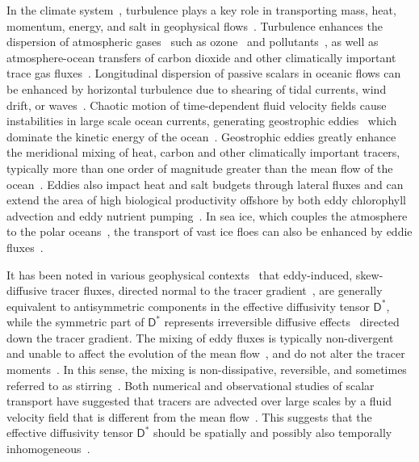 \documentclass[leqno,onefignum,onetabnum]{siamltex1213}
\newcommand{\Dm}{\mathsf{D}}
\begin{document}
In the climate
system~\cite{Csanady:1973:9789027702609,Griffies:2003:10.1007},
turbulence plays a key role in transporting mass, heat, momentum,
energy, and salt in geophysical
flows~\cite{Moffatt:RPP:621}. Turbulence enhances the dispersion of
atmospheric gases~\cite{Espinosa:MET1292} such as
ozone~\cite{Holton:JGRC2495,Pitari:JGR:1986,Plumb:JAS:1979,Plumb:JAS:1987}
and
pollutants~\cite{Bilger:10.1175,Beychok:1994:9780964458802,Samson:1988:88009978},
as well as atmosphere-ocean transfers of carbon dioxide and other
climatically important trace gas
fluxes~\cite{Zappa:2007:67613,Banerjee:10.1007}.  Longitudinal
dispersion of passive scalars in oceanic flows can be enhanced by
horizontal turbulence due to shearing of tidal currents, wind drift,
or
waves~\cite{Young:JPO:1982:515,Kullenberg:1972:TUS1529,Bowden:JFM:1965}.   
Chaotic motion of 
time-dependent fluid velocity fields cause instabilities in large
scale ocean currents, generating geostrophic
eddies~\cite{Ferrari:JPO:1501} which dominate the kinetic energy of
the ocean~\cite{Ferrari:ARFM:253}. Geostrophic
eddies greatly enhance~\cite{Ferrari:JPO:1501} the meridional mixing
of heat, carbon and other climatically important tracers, typically
more than one order of magnitude greater than the mean flow of the
ocean~\cite{Souza:OS:317}. Eddies also impact heat and salt budgets
through lateral fluxes and can extend the area of high biological
productivity offshore by both eddy chlorophyll advection and eddy
nutrient pumping~\cite{Chaigneau:JGR:C11025}. In sea ice, which
couples the atmosphere to the polar
oceans~\cite{Washington:1986:9780935702521}, the transport of vast ice
floes can also be enhanced by eddie
fluxes~\cite{Watanabe:2009JPO4010,Lukovich:Sea_ice_dynamics}. 







It has been noted in various geophysical
contexts~\cite{Plumb:JAS:1979,Plumb:JAS:1987} that eddy-induced,
skew-diffusive tracer fluxes, directed normal to the tracer
gradient~\cite{Middleton:JPO:5840223}, are generally equivalent to
antisymmetric components in the effective 
diffusivity tensor $\Dm^*$, while the symmetric part of $\Dm^*$
represents irreversible diffusive
effects~\cite{Redi:JPO:1982:1154,Solomon:OGR:1971:233,Griffies:JPO:1998}
directed down the tracer gradient. The mixing of eddy fluxes is
typically non-divergent and unable to affect the evolution of the mean
flow~\cite{Middleton:JPO:5840223}, and do not alter the tracer
moments~\cite{Griffies:JPO:1998}. In this sense, the 
mixing is non-dissipative, reversible, and sometimes referred to as
stirring~\cite{Eckart:JMR:1948,Griffies:JPO:1998}. Both numerical and
observational studies of scalar transport have suggested that tracers
are advected over large scales by a fluid velocity field that is
different from the mean flow~\cite{Pavliotis:PHD_Thesis}. This
suggests that the effective diffusivity tensor $\Dm^*$ should be
spatially and possibly also temporally
inhomogeneous~\cite{Pavliotis:PHD_Thesis}. 
\end{document}
